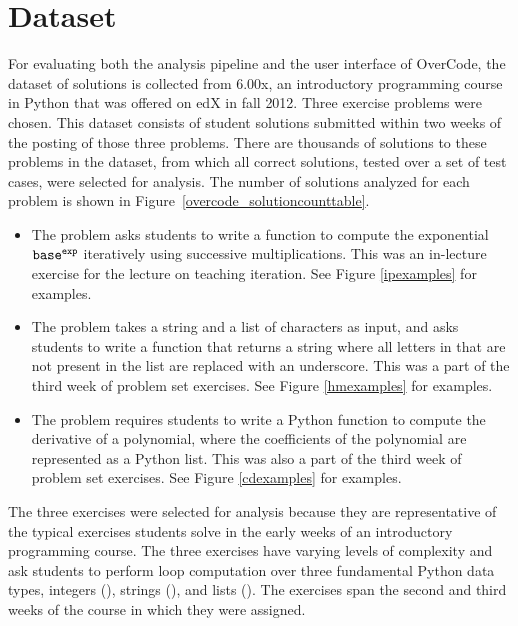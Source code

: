 \section{Dataset} \label{dataset}

For evaluating both the analysis pipeline and the user interface of OverCode, the dataset of solutions is collected from 6.00x, an introductory programming course in Python that was offered on edX in fall 2012. Three exercise problems were chosen. This dataset consists of student solutions submitted within two weeks of the posting of those three problems. There are thousands of solutions to these problems in the dataset, from which all correct solutions, tested over a set of test cases, were selected for analysis. The number of solutions analyzed for each problem is shown in Figure~\ref{overcode_solutioncounttable}.




\begin{itemize}
\item {\bf {}} The  problem asks students to write a function to compute the exponential $\texttt{base}^{\texttt{exp}}$ iteratively using successive multiplications. This was an in-lecture exercise for the lecture on teaching iteration. See Figure \ref{ipexamples} for examples.
\item {\bf {}} The  problem takes a string  and a list of characters  as input, and asks students to write a function that returns a string where all letters in  that are not present in the list  are replaced with an underscore. This was a part of the third week of problem set exercises. See Figure \ref{hmexamples} for examples.
\item {\bf {}} The  problem requires students to write a Python function to compute the derivative of a polynomial, where the coefficients of the polynomial are represented as a Python list. This was also a part of the third week of problem set exercises. See Figure \ref{cdexamples} for examples.
\end{itemize}

The three exercises were selected for analysis because they are representative of the typical exercises students solve in the early weeks of an introductory programming course. The three exercises have varying levels of complexity and ask students to perform loop computation over three fundamental Python data types, integers (), strings (), and lists (). The exercises span the second and third weeks of the course in which they were assigned.

